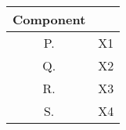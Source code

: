 \begin{tabular}[12pt]{ |c|l| }
  \hline
  \textbf{Component} & \\ \hline
  P. & X1 \\ \hline
  Q. & X2 \\ \hline
  R. & X3 \\ \hline
  S. & X4 \\ \hline
\end{tabular}
